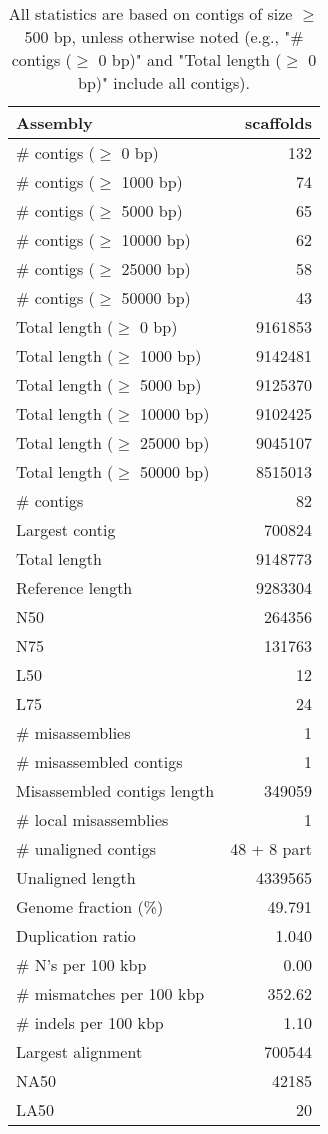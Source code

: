\documentclass[12pt,a4paper]{article}
\begin{document}
\begin{table}[ht]
\begin{center}
\caption{All statistics are based on contigs of size $\geq$ 500 bp, unless otherwise noted (e.g., "\# contigs ($\geq$ 0 bp)" and "Total length ($\geq$ 0 bp)" include all contigs).}
\begin{tabular}{|l*{1}{|r}|}
\hline
Assembly & scaffolds \\ \hline
\# contigs ($\geq$ 0 bp) & 132 \\ \hline
\# contigs ($\geq$ 1000 bp) & 74 \\ \hline
\# contigs ($\geq$ 5000 bp) & 65 \\ \hline
\# contigs ($\geq$ 10000 bp) & 62 \\ \hline
\# contigs ($\geq$ 25000 bp) & 58 \\ \hline
\# contigs ($\geq$ 50000 bp) & 43 \\ \hline
Total length ($\geq$ 0 bp) & 9161853 \\ \hline
Total length ($\geq$ 1000 bp) & 9142481 \\ \hline
Total length ($\geq$ 5000 bp) & 9125370 \\ \hline
Total length ($\geq$ 10000 bp) & 9102425 \\ \hline
Total length ($\geq$ 25000 bp) & 9045107 \\ \hline
Total length ($\geq$ 50000 bp) & 8515013 \\ \hline
\# contigs & 82 \\ \hline
Largest contig & 700824 \\ \hline
Total length & 9148773 \\ \hline
Reference length & 9283304 \\ \hline
N50 & 264356 \\ \hline
N75 & 131763 \\ \hline
L50 & 12 \\ \hline
L75 & 24 \\ \hline
\# misassemblies & 1 \\ \hline
\# misassembled contigs & 1 \\ \hline
Misassembled contigs length & 349059 \\ \hline
\# local misassemblies & 1 \\ \hline
\# unaligned contigs & 48 + 8 part \\ \hline
Unaligned length & 4339565 \\ \hline
Genome fraction (\%) & 49.791 \\ \hline
Duplication ratio & 1.040 \\ \hline
\# N's per 100 kbp & 0.00 \\ \hline
\# mismatches per 100 kbp & 352.62 \\ \hline
\# indels per 100 kbp & 1.10 \\ \hline
Largest alignment & 700544 \\ \hline
NA50 & 42185 \\ \hline
LA50 & 20 \\ \hline
\end{tabular}
\end{center}
\end{table}
\end{document}
